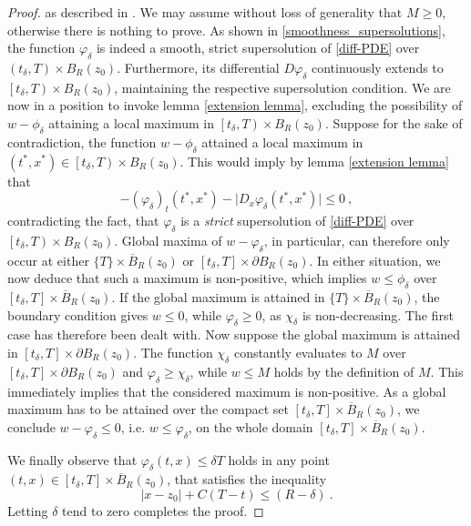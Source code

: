 \begin{theorem}
\begin{proof}
				as described in \cite[p.~73]{barles}. We may assume without loss of generality that $ M \geq 0 $, otherwise there is nothing to prove. As shown in \ref{smoothness_supersolutions}, the function $ \varphi_{\delta} $ is indeed a smooth, strict supersolution of \eqref{diff-PDE} over $ \left(t_{\delta}, T \right) \times B_R(z_0) $. Furthermore, its differential $ D \varphi_{\delta} $ continuously extends to $ \left[t_{\delta}, T \right) \times B_R(z_0) $, maintaining the respective supersolution condition. We are now in a position to invoke lemma \ref{extension lemma}, excluding the possibility of $ w - \phi_{\delta} $ attaining a local maximum in $ \left[t_{\delta}, T \right) \times B_R (z_0) $. Suppose for the sake of contradiction, the function $ w - \phi_{\delta} $ attained a local maximum in $ (t^{*}, x^{*}) \in \left[t_{\delta}, T \right) \times B_R (z_0) $. This would imply by lemma \ref{extension lemma} that
				\begin{equation*}
					-(\varphi_{\delta})_t(t^*, x^*) - \lvert D_x \varphi_{\delta}(t^*, x^*) \rvert \leq 0 \ ,
				\end{equation*}
				contradicting the fact, that $ \varphi_{\delta} $ is a \emph{strict} supersolution of \eqref{diff-PDE} over $ \left[t_{\delta}, T \right) \times B_R (z_0) $.
				Global maxima of $ w - \varphi_{\delta} $, in particular, can therefore only occur at either $ \{T\} \times \overline{B}_R (z_0) $ or $ \left[t_{\delta}, T\right] \times \partial B_R(z_0) $. In either situation, we now deduce that such a maximum is non-positive, which implies $ w \leq \phi_{\delta} $ over $  \left[ t_{\delta}, T \right] \times \overline{B}_R (z_0) $. If the global maximum is attained in $ \{T\} \times \overline{B}_R (z_0) $, the boundary condition gives $ w \leq 0 $, while $ \varphi_{\delta} \geq 0 $, as $ \chi_{\delta} $ is non-decreasing. The first case has therefore been dealt with. Now suppose the global maximum is attained in $ \left[t_{\delta}, T\right] \times \partial B_R(z_0) $. The function $ \chi_{\delta} $ constantly evaluates to $ M $ over $ \left[t_{\delta}, T\right] \times \partial B_R(z_0) $ and $ \varphi_{\delta} \geq \chi_{\delta} $, while $ w \leq M $ holds by the definition of $ M $. This immediately implies that the considered maximum is non-positive. As a global maximum has to be attained over the compact set $ \left[t_{\delta}, T\right] \times \overline{B}_R (z_0)$, we conclude $ w - \varphi_{\delta} \leq 0$, i.e. $ w \leq \varphi_{\delta} $, on the whole domain $ \left[t_{\delta}, T\right] \times \overline{B}_R (z_0) $.
				
				We finally observe that $ \varphi_{\delta}(t, x) \leq \delta T $ holds in any point $ (t, x) \in \left[t_{\delta}, T\right] \times \overline{B}_R(z_0)$, that satisfies the inequality
				\begin{equation*}
					\lvert x - z_0 \rvert + C(T - t) \leq (R - \delta) \ .
				\end{equation*}
				Letting $ \delta $ tend to zero completes the proof.
			\end{proof}
		\end{theorem}